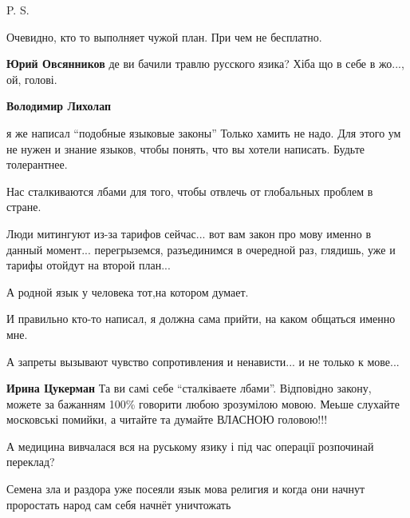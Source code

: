 \begin{itemize}
P. S.

Очевидно, кто то выполняет чужой план. При чем не бесплатно.

\begin{itemize}
\textbf{Юрий Овсянников} де ви бачили травлю русского язика? Хіба що в себе в жо..., ой, голові.

\textbf{Володимир Лихолап} 

я же написал \enquote{подобные языковые законы} Только хамить не надо. Для
этого ум не нужен и знание языков, чтобы понять, что вы хотели написать. Будьте
толерантнее.
\end{itemize}


Нас сталкиваются лбами для того, чтобы отвлечь от глобальных проблем в стране.

Люди митингуют из-за тарифов сейчас... вот вам закон про мову именно в данный
момент... перегрыземся, разъединимся в очередной раз, глядишь, уже и тарифы
отойдут на второй план...

А родной язык у человека тот,на котором думает.

И правильно кто-то написал, я должна сама прийти, на каком общаться именно мне.

А запреты вызывают чувство сопротивления и ненависти... и не только к мове...

\begin{itemize}
\textbf{Ирина Цукерман} Та ви самі себе \enquote{сталківаете лбами}. Відповідно
закону, можете за бажанням 100\% говорити любою зрозумілою мовою. Меьше
слухайте московські помийки, а читайте та думайте ВЛАСНОЮ головою!!!

\end{itemize}

А медицина вивчалася вся на руському язику і під час операції розпочинай переклад?

Семена зла и раздора уже посеяли язык мова религия и когда они начнут проростать народ сам себя начнёт уничтожать


\end{itemize}
